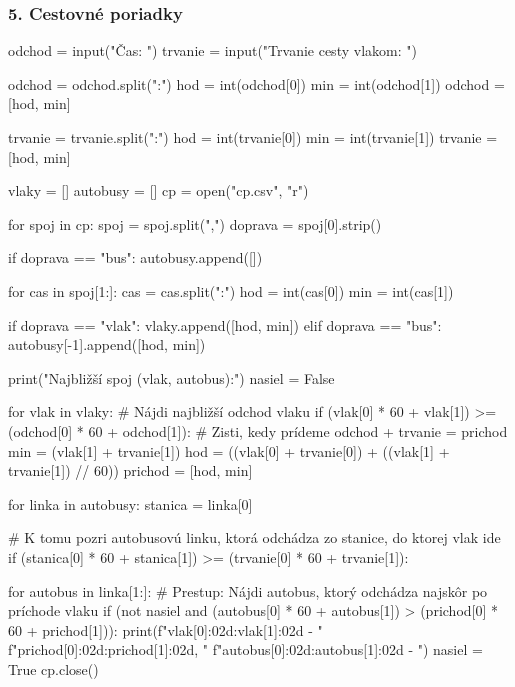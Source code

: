 \subsubsection*{5. Cestovné poriadky}
\begin{solution}
odchod = input("Čas: ")
trvanie = input("Trvanie cesty vlakom: ")

odchod = odchod.split(":")
hod = int(odchod[0])
min = int(odchod[1])
odchod = [hod, min]

trvanie = trvanie.split(":")
hod = int(trvanie[0])
min = int(trvanie[1])
trvanie = [hod, min]

vlaky = []
autobusy = []
cp = open("cp.csv", "r")

for spoj in cp:
    spoj = spoj.split(",")
    doprava = spoj[0].strip()

    if doprava == "bus":
        autobusy.append([])

    for cas in spoj[1:]:
        cas = cas.split(":")
        hod = int(cas[0])
        min = int(cas[1])

        if doprava == "vlak":
            vlaky.append([hod, min])
        elif doprava == "bus":
            autobusy[-1].append([hod, min])

print("Najbližší spoj (vlak, autobus):")
nasiel = False

for vlak in vlaky:
    # Nájdi najbližší odchod vlaku
    if (vlak[0] * 60 + vlak[1]) >= (odchod[0] * 60 + odchod[1]):
        # Zisti, kedy prídeme odchod + trvanie = prichod
        min = (vlak[1] + trvanie[1]) %
        hod = ((vlak[0] + trvanie[0]) + ((vlak[1] + trvanie[1]) // 60)) %
        prichod = [hod, min]

        for linka in autobusy:
            stanica = linka[0]

            # K tomu pozri autobusovú linku, ktorá odchádza zo stanice, do ktorej vlak ide
            if (stanica[0] * 60 + stanica[1]) >= (trvanie[0] * 60 + trvanie[1]):

                for autobus in linka[1:]:
                    # Prestup: Nájdi autobus, ktorý odchádza najskôr po príchode vlaku
                    if (not nasiel and (autobus[0] * 60 + autobus[1]) > (prichod[0] * 60 + prichod[1])):
                        print(f"{vlak[0]:02d}:{vlak[1]:02d} - "
                              f"{prichod[0]:02d}:{prichod[1]:02d}, "
                              f"{autobus[0]:02d}:{autobus[1]:02d} - ")
                        nasiel = True
cp.close()
\end{solution}
